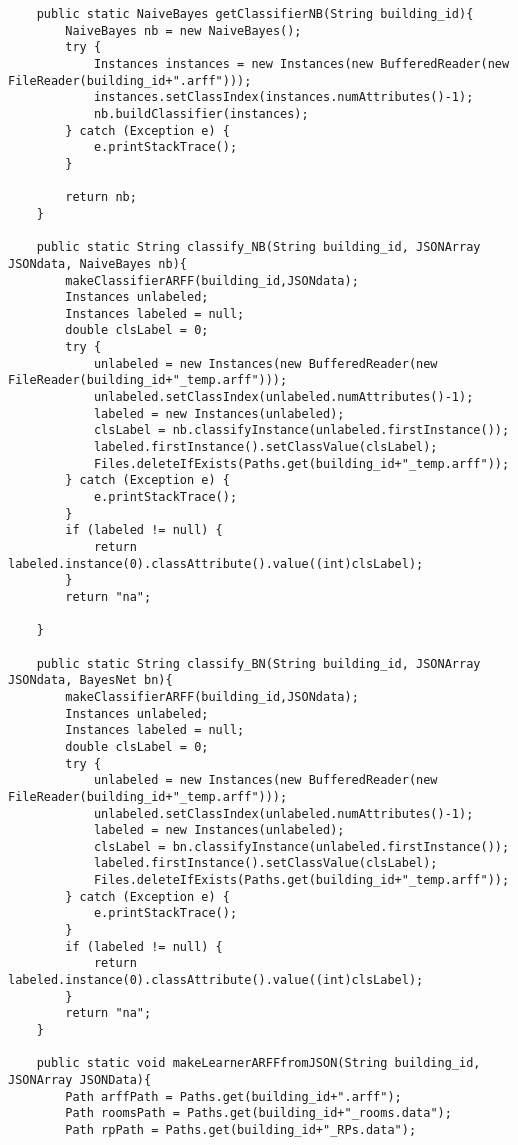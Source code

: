 \begin{lstlisting}
    public static NaiveBayes getClassifierNB(String building_id){
        NaiveBayes nb = new NaiveBayes();
        try {
            Instances instances = new Instances(new BufferedReader(new FileReader(building_id+".arff")));
            instances.setClassIndex(instances.numAttributes()-1);
            nb.buildClassifier(instances);
        } catch (Exception e) {
            e.printStackTrace();
        }

        return nb;
    }

    public static String classify_NB(String building_id, JSONArray JSONdata, NaiveBayes nb){
        makeClassifierARFF(building_id,JSONdata);
        Instances unlabeled;
        Instances labeled = null;
        double clsLabel = 0;
        try {
            unlabeled = new Instances(new BufferedReader(new FileReader(building_id+"_temp.arff")));
            unlabeled.setClassIndex(unlabeled.numAttributes()-1);
            labeled = new Instances(unlabeled);
            clsLabel = nb.classifyInstance(unlabeled.firstInstance());
            labeled.firstInstance().setClassValue(clsLabel);
            Files.deleteIfExists(Paths.get(building_id+"_temp.arff"));
        } catch (Exception e) {
            e.printStackTrace();
        }
        if (labeled != null) {
            return labeled.instance(0).classAttribute().value((int)clsLabel);
        }
        return "na";

    }

    public static String classify_BN(String building_id, JSONArray JSONdata, BayesNet bn){
        makeClassifierARFF(building_id,JSONdata);
        Instances unlabeled;
        Instances labeled = null;
        double clsLabel = 0;
        try {
            unlabeled = new Instances(new BufferedReader(new FileReader(building_id+"_temp.arff")));
            unlabeled.setClassIndex(unlabeled.numAttributes()-1);
            labeled = new Instances(unlabeled);
            clsLabel = bn.classifyInstance(unlabeled.firstInstance());
            labeled.firstInstance().setClassValue(clsLabel);
            Files.deleteIfExists(Paths.get(building_id+"_temp.arff"));
        } catch (Exception e) {
            e.printStackTrace();
        }
        if (labeled != null) {
            return labeled.instance(0).classAttribute().value((int)clsLabel);
        }
        return "na";
    }

    public static void makeLearnerARFFfromJSON(String building_id, JSONArray JSONData){
        Path arffPath = Paths.get(building_id+".arff");
        Path roomsPath = Paths.get(building_id+"_rooms.data");
        Path rpPath = Paths.get(building_id+"_RPs.data");


\end{lstlisting}
